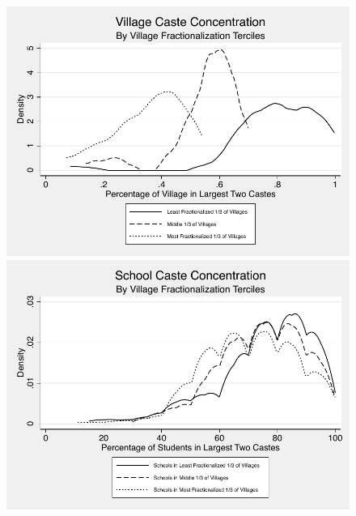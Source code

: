\documentclass[handout]{beamer}
\begin{document}
\begin{frame}{}
	\begin{figure}[htb]
		\begin{center}
		\includegraphics[scale=0.4]{graphs/village_toptwo.pdf}
		\pause \\
		\includegraphics[scale=0.4]{graphs/school_toptwo.pdf}
		\end{center}
	\end{figure}
\end{frame}
\end{document}

